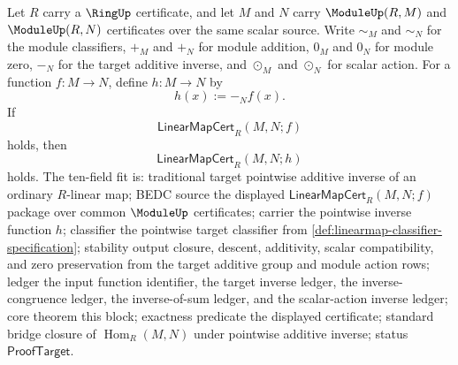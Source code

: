 \begin{theorem}
\label{thm:module-linearmap-pointwise-inverse-certificate}
Let $R$ carry a $\RingUp$ certificate, and let $M$ and $N$ carry $\ModuleUp(R,M)$ and $\ModuleUp(R,N)$ certificates over the same scalar source. Write $\sim_M$ and $\sim_N$ for the module classifiers, $+_M$ and $+_N$ for module addition, $0_M$ and $0_N$ for module zero, $-_N$ for the target additive inverse, and $\odot_M$ and $\odot_N$ for scalar action. For a function $f:M\to N$, define $h:M\to N$ by
$$
h(x):=-_N f(x).
$$
If
$$
\mathsf{LinearMapCert}_R(M,N;f)
$$
holds, then
$$
\mathsf{LinearMapCert}_R(M,N;h)
$$
holds.
The ten-field fit is: traditional target pointwise additive inverse of an ordinary $R$-linear map; BEDC source the displayed $\mathsf{LinearMapCert}_R(M,N;f)$ package over common $\ModuleUp$ certificates; carrier the pointwise inverse function $h$; classifier the pointwise target classifier from \autoref{def:linearmap-classifier-specification}; stability output closure, descent, additivity, scalar compatibility, and zero preservation from the target additive group and module action rows; ledger the input function identifier, the target inverse ledger, the inverse-congruence ledger, the inverse-of-sum ledger, and the scalar-action inverse ledger; core theorem this block; exactness predicate the displayed certificate; standard bridge closure of $\operatorname{Hom}_R(M,N)$ under pointwise additive inverse; status $\mathsf{ProofTarget}$.
\end{theorem}
